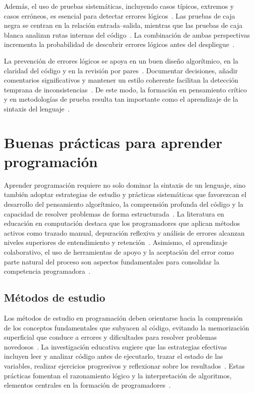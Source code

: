 \documentclass[12pt,twoside]{book}
\begin{document}
						Además, el uso de pruebas sistemáticas, incluyendo casos típicos, extremos y casos erróneos, es esencial para detectar errores lógicos~\cite{Pressman2019Software}. Las pruebas de caja negra se centran en la relación entrada–salida, mientras que las pruebas de caja blanca analizan rutas internas del código~\cite{Sommerville2015Software}. La combinación de ambas perspectivas incrementa la probabilidad de descubrir errores lógicos antes del despliegue~\cite{Stallings2021Computer}.
						
						La prevención de errores lógicos se apoya en un buen diseño algorítmico, en la claridad del código y en la revisión por pares~\cite{Pressman2019Software}. Documentar decisiones, añadir comentarios significativos y mantener un estilo coherente facilitan la detección temprana de inconsistencias~\cite{Sommerville2015Software}. De este modo, la formación en pensamiento crítico y en metodologías de prueba resulta tan importante como el aprendizaje de la sintaxis del lenguaje~\cite{Gaddis2022Starting}.
				
			\section{Buenas prácticas para aprender programación}
				Aprender programación requiere no solo dominar la sintaxis de un lenguaje, sino también adoptar estrategias de estudio y prácticas sistemáticas que favorezcan el desarrollo del pensamiento algorítmico, la comprensión profunda del código y la capacidad de resolver problemas de forma estructurada~\cite{Gaddis2022Starting}. La literatura en educación en computación destaca que los programadores que aplican métodos activos como trazado manual, depuración reflexiva y análisis de errores alcanzan niveles superiores de entendimiento y retención~\cite{Sommerville2015Software}. Asimismo, el aprendizaje colaborativo, el uso de herramientas de apoyo y la aceptación del error como parte natural del proceso son aspectos fundamentales para consolidar la competencia programadora~\cite{Pressman2019Software,Stallings2021Computer}.
				
				\subsection{Métodos de estudio}
					Los métodos de estudio en programación deben orientarse hacia la comprensión de los conceptos fundamentales que subyacen al código, evitando la memorización superficial que conduce a errores y dificultades para resolver problemas novedosos~\cite{Gaddis2022Starting}. La investigación educativa sugiere que las estrategias efectivas incluyen leer y analizar código antes de ejecutarlo, trazar el estado de las variables, realizar ejercicios progresivos y reflexionar sobre los resultados~\cite{Sommerville2015Software}. Estas prácticas fomentan el razonamiento lógico y la interpretación de algoritmos, elementos centrales en la formación de programadores~\cite{Pressman2019Software}.
					
\end{document}
